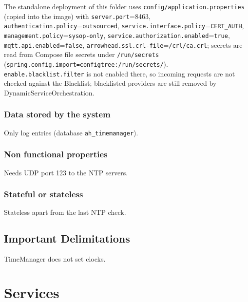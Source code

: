 \documentclass[a4paper]{arrowhead}
\begin{document}
The standalone deployment of this folder uses \texttt{config/\allowbreak{}application.\allowbreak{}properties} (copied into the image) with \texttt{server.\allowbreak{}port}=8463, \texttt{authentication.\allowbreak{}policy}=\texttt{outsourced}, \texttt{service.\allowbreak{}interface.\allowbreak{}policy}=\texttt{CERT\_AUTH}, \texttt{management.\allowbreak{}policy}=\texttt{sysop-\allowbreak{}only}, \texttt{service.\allowbreak{}authorization.\allowbreak{}enabled}=\texttt{true}, \texttt{mqtt.\allowbreak{}api.\allowbreak{}enabled}=\texttt{false}, \texttt{arrowhead.\allowbreak{}ssl.\allowbreak{}crl-\allowbreak{}file}=\texttt{/\allowbreak{}crl/\allowbreak{}ca.\allowbreak{}crl}; secrets are read from Compose file secrets under \texttt{/\allowbreak{}run/\allowbreak{}secrets} (\texttt{spring.\allowbreak{}config.\allowbreak{}import=\allowbreak{}configtree:\allowbreak{}/\allowbreak{}run/\allowbreak{}secrets/}). \texttt{enable.\allowbreak{}blacklist.\allowbreak{}filter} is not enabled there, so incoming requests are not checked against the Blacklist; blacklisted providers are still removed by Dynamic\allowbreak{}Service\allowbreak{}Orchestration.

\subsubsection{Data stored by the system}

Only log entries (database \texttt{ah\_\allowbreak{}timemanager}).

\subsubsection{Non functional properties}

Needs UDP port 123 to the NTP servers.

\subsubsection{Stateful or stateless}

Stateless apart from the last NTP check.

\subsection{Important Delimitations}
\label{sec:delimitations}

TimeManager does not set clocks.

\newpage

\section{Services}
\label{sec:services}
\end{document}
